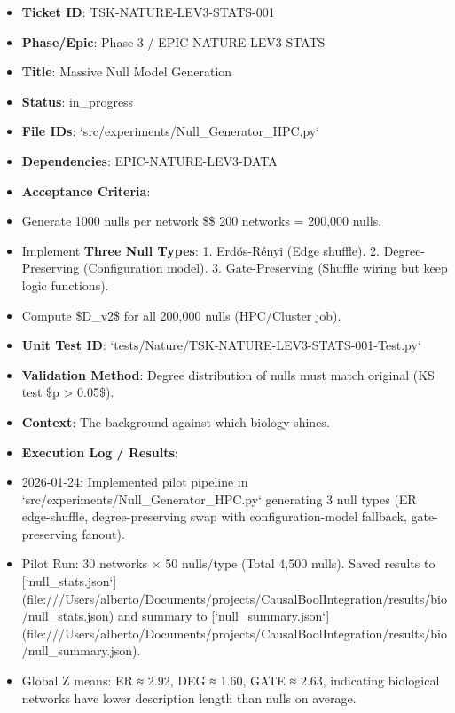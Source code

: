 \documentclass{article}
\begin{document}
\begin{itemize}
\item   \textbf{Ticket ID}: TSK-NATURE-LEV3-STATS-001
\item   \textbf{Phase/Epic}: Phase 3 / EPIC-NATURE-LEV3-STATS
\item   \textbf{Title}: Massive Null Model Generation
\item   \textbf{Status}: in\_progress
\item   \textbf{File IDs}: `src/experiments/Null\_Generator\_HPC.py`
\item   \textbf{Dependencies}: EPIC-NATURE-LEV3-DATA
\item   \textbf{Acceptance Criteria}:
\item   Generate 1000 nulls per network \$\times\$ 200 networks = 200,000 nulls.
\item   Implement \textbf{Three Null Types}:
            1.  Erdős-Rényi (Edge shuffle).
            2.  Degree-Preserving (Configuration model).
            3.  Gate-Preserving (Shuffle wiring but keep logic functions).
\item   Compute \$D\_{v2}\$ for all 200,000 nulls (HPC/Cluster job).
\item   \textbf{Unit Test ID}: `tests/Nature/TSK-NATURE-LEV3-STATS-001-Test.py`
\item   \textbf{Validation Method}: Degree distribution of nulls must match original (KS test \$p > 0.05\$).
\item   \textbf{Context}: The background against which biology shines.
\item   \textbf{Execution Log / Results}:
\item   2026-01-24: Implemented pilot pipeline in `src/experiments/Null\_Generator\_HPC.py` generating 3 null types (ER edge-shuffle, degree-preserving swap with configuration-model fallback, gate-preserving fanout).
\item   Pilot Run: 30 networks × 50 nulls/type (Total 4,500 nulls). Saved results to [`null\_stats.json`](file:///Users/alberto/Documents/projects/CausalBoolIntegration/results/bio/null\_stats.json) and summary to [`null\_summary.json`](file:///Users/alberto/Documents/projects/CausalBoolIntegration/results/bio/null\_summary.json).
\item   Global Z means: ER ≈ 2.92, DEG ≈ 1.60, GATE ≈ 2.63, indicating biological networks have lower description length than nulls on average.
\end{itemize}
\end{document}
